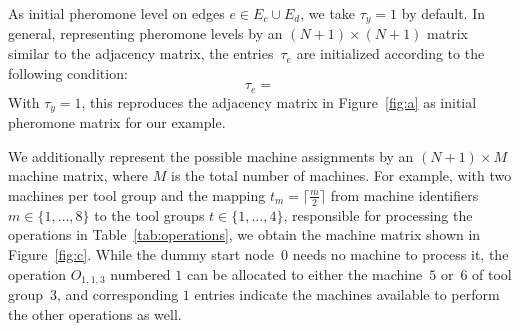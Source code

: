 \documentclass[runningheads]{llncs}
\begin{document}
As initial pheromone level on edges $e\in E_c\cup E_d$,
we take $\tau_y=1$ by default.
In general, representing pheromone levels by an $(N+1)\times(N+1)$
matrix similar to the adjacency matrix,
the entries~$\tau_{e}$ are initialized according to the following condition:\linebreak[1]%
%
\begin{equation}
	\tau_{e} =
\end{equation}  
%
With $\tau_y=1$, this reproduces the adjacency matrix in Figure~\ref{fig:a}
as initial pheromone matrix for our example.

We additionally represent the possible machine assignments
by an $(N+1)\times M$ machine matrix, where $M$ is the total number of
machines.
For example, with two machines per tool group and the mapping
$t_m=\lceil \frac{m}{2} \rceil$ from machine identifiers
$m\in \{1,\dots,8\}$ to the tool groups $t\in\{1,\dots,4\}$,
responsible for processing the operations in Table~\ref{tab:operations},
we obtain the machine matrix shown in Figure~\ref{fig:c}.
While the dummy start node~$0$ needs no machine to process it,
the operation $O_{1,1,3}$ numbered $1$ can be allocated to either the
machine~$5$ or~$6$ of tool group~$3$, and
corresponding $1$ entries indicate the machines available to perform
the other operations as well.
%
\end{document}
